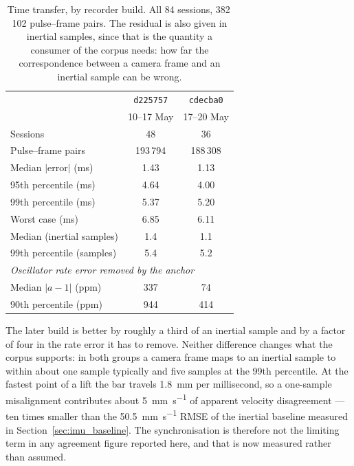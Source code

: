 \begin{table}[t]
  \centering
  \caption{Time transfer, by recorder build. All 84 sessions, 382\,102 pulse--frame pairs.
           The residual is also given in inertial samples, since that is the quantity a
           consumer of the corpus needs: how far the correspondence between a camera frame
           and an inertial sample can be wrong.}
  \label{tab:sync_by_build}
  \begin{tabular}{lcc}
    \hline
    & \texttt{d225757} & \texttt{cdecba0} \\
    & 10--17 May & 17--20 May \\
    \hline
    Sessions                        & 48      & 36      \\
    Pulse--frame pairs              & 193\,794 & 188\,308 \\
    \hline
    Median $|$error$|$ (ms)         & 1.43    & 1.13    \\
    95th percentile (ms)            & 4.64    & 4.00    \\
    99th percentile (ms)            & 5.37    & 5.20    \\
    Worst case (ms)                 & 6.85    & 6.11    \\
    \hline
    Median (inertial samples)       & 1.4     & 1.1     \\
    99th percentile (samples)       & 5.4     & 5.2     \\
    \hline
    \multicolumn{3}{l}{\emph{Oscillator rate error removed by the anchor}} \\
    Median $|a-1|$ (ppm)            & 337     & 74      \\
    90th percentile (ppm)           & 944     & 414     \\
    \hline
  \end{tabular}
\end{table}

The later build is better by roughly a third of an inertial sample and by a factor of four
in the rate error it has to remove. Neither difference changes what the corpus supports:
in both groups a camera frame maps to an inertial sample to within about one sample
typically and five samples at the 99th percentile. At the fastest point of a lift the bar
travels \SI{1.8}{\milli\metre} per millisecond, so a one-sample misalignment contributes
about \SI{5}{\milli\metre\per\second} of apparent velocity disagreement --- ten times
smaller than the \SI{50.5}{\milli\metre\per\second} RMSE of the inertial baseline measured
in Section~\ref{sec:imu_baseline}. The synchronisation is therefore not the limiting term in any
agreement figure reported here, and that is now measured rather than assumed.


